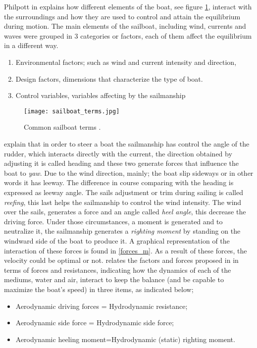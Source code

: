 Philpott  in \cite{philpott1993yacht} explains how different elements of the boat, see figure \ref{sailboat_terms}, interact with the surroundings and how they are used to control and attain the equilibrium during motion. The main elements of the sailboat, including wind, currents and waves were grouped in 3 categories or factors, each of them affect the equilibrium in a different way.
 \begin{enumerate} \label{factorphil}
 \item Environmental factors; such as wind and current intensity and direction,
 \item Design factors, dimensions that characterize the type of boat. 
 \item Control variables, variables affecting by the sailmanship
 \end{enumerate}
 
 \begin{figure}[ht]
\centering
  \texttt{[image: sailboat\_terms.jpg]}
 \caption{Common sailboat terms \cite{sailboat_terms}. }
\label{sailboat_terms}
\end{figure}
 
\cite{philpott1993yacht}  explain that in order to steer a boat the sailmanship has control the angle of the rudder, which interacts directly with the current, the direction obtained by adjusting it is called heading and these two generate forces that influence the boat to \textit{yaw}. Due to the wind direction, mainly; the boat slip sideways or in other words it has leeway. The difference in course comparing with the heading is expressed as leeway angle. The sails adjustment or trim during sailing is called \textit{reefing}, this last helps the sailmanship to control the wind intensity.  The wind over the sails, generates a force and an angle called \textit{heel angle}, this decrease the driving force. Under those circumstances, a moment is generated and to neutralize it, the sailmanship generates a \textit{righting moment} by standing on the windward side of the boat to produce it. A graphical representation of the interaction of these forces is  found in \ref{forces_m}.  As a result of these forces, the velocity could be optimal or not. \cite{larsonprinciples} relates the factors and forces proposed in\cite{philpott1993yacht} in terms of forces and resistances, indicating how the dynamics of each of the mediums, water and air,  interact to keep the balance (and be capable to maximize the boat's speed)  in three items, as indicated below; 
\begin{itemize}  \label{milgramforces}
 \setlength \itemsep{0em}
\item Aerodynamic driving forces = Hydrodynamic resistance;
\item Aerodynamic side force = Hydrodynamic side force;
\item Aerodynamic heeling moment=Hydrodynamic (static) righting moment.
\end{itemize}

